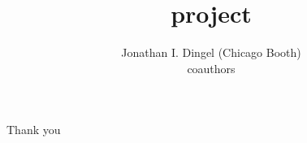 \documentclass[11pt,notes=hide,aspectratio=169,mathserif]{beamer}
\title[project]{project}
\author[Dingel \& friends ]{Jonathan I. Dingel (Chicago Booth) \\ coauthors}
\date{\monthname[\the\month] \the\year}
\begin{document}
\begin{frame}[plain]
\titlepage
\note{
	\begin{itemize}
	\end{itemize}
}
\end{frame}
%

\begin{frame}[plain]
\begin{center}{\LARGE Thank you}\end{center}
\end{frame}


\appendix
%

%
\end{document}
